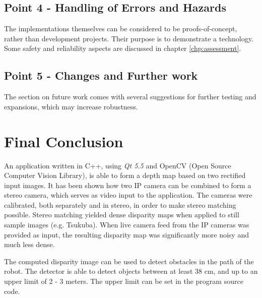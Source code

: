 \subsection{Point 4 - Handling of Errors and Hazards}
The implementations themselves can be considered to be proofs-of-concept, rather than development projects. Their purpose is to demonstrate a technology. Some safety and reliability aspects are discussed in chapter \ref{chp:assessment}.
  
\subsection{Point 5 - Changes and Further work}
The section on future work comes with several suggestions for further testing and expansions, which may increase robustness. 

\section{Final Conclusion}

An application written in C++, using \textit{Qt 5.5} and OpenCV (Open Source Computer Vision Library), is able to form a depth map based on two rectified input images. It has been shown how two IP camera can be combined to form a stereo camera, which serves as video input to the application. The cameras were calibrated, both separately and in stereo, in order to make stereo matching possible. Stereo matching yielded dense disparity maps when applied to still sample images (e.g. Tsukuba). When live camera feed from the IP cameras was provided as input, the resulting disparity map was significantly more noisy and much less dense. 

The computed disparity image can be used to detect obstacles in the path of the robot. The detector is able to detect objects between at least 38 cm, and up to an upper limit of 2 - 3 meters. The upper limit can be set in the program source code. 